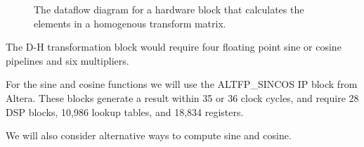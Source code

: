 \begin{figure}[ht]
\center
{}
\caption{The dataflow diagram for a hardware block that calculates the elements in a homogenous transform matrix.}
\label{fig:dh_transform_block}
\end{figure}

The D-H transformation block would require four floating point sine or cosine pipelines and six multipliers.

For the sine and cosine functions we will use the ALTFP\_SINCOS IP block from Altera. These blocks generate a result within 35 or 36 clock cycles, and require 28 DSP blocks, 10,986 lookup tables, and 18,834 registers.

We will also consider alternative ways to compute sine and cosine.
